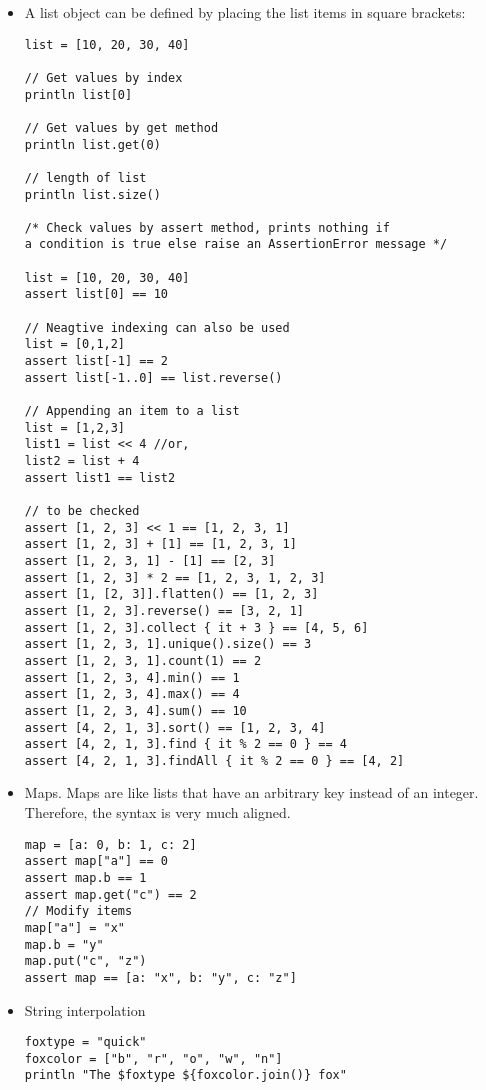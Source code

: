 \documentclass[letterpaper,11pt]{article}
\begin{document}
\begin{itemize}
    \item A list object can be defined by placing the list items in square brackets:
    \begin{verbatim}
list = [10, 20, 30, 40]

// Get values by index
println list[0]

// Get values by get method
println list.get(0)

// length of list
println list.size()

/* Check values by assert method, prints nothing if
a condition is true else raise an AssertionError message */

list = [10, 20, 30, 40]
assert list[0] == 10

// Neagtive indexing can also be used
list = [0,1,2]
assert list[-1] == 2
assert list[-1..0] == list.reverse()

// Appending an item to a list
list = [1,2,3]
list1 = list << 4 //or,
list2 = list + 4
assert list1 == list2

// to be checked
assert [1, 2, 3] << 1 == [1, 2, 3, 1]
assert [1, 2, 3] + [1] == [1, 2, 3, 1]
assert [1, 2, 3, 1] - [1] == [2, 3]
assert [1, 2, 3] * 2 == [1, 2, 3, 1, 2, 3]
assert [1, [2, 3]].flatten() == [1, 2, 3]
assert [1, 2, 3].reverse() == [3, 2, 1]
assert [1, 2, 3].collect { it + 3 } == [4, 5, 6]
assert [1, 2, 3, 1].unique().size() == 3
assert [1, 2, 3, 1].count(1) == 2
assert [1, 2, 3, 4].min() == 1
assert [1, 2, 3, 4].max() == 4
assert [1, 2, 3, 4].sum() == 10
assert [4, 2, 1, 3].sort() == [1, 2, 3, 4]
assert [4, 2, 1, 3].find { it % 2 == 0 } == 4
assert [4, 2, 1, 3].findAll { it % 2 == 0 } == [4, 2]
    \end{verbatim}
    \item Maps. Maps are like lists that have an arbitrary key instead of an integer. Therefore, the syntax is very much aligned.
    \begin{verbatim}
map = [a: 0, b: 1, c: 2]
assert map["a"] == 0
assert map.b == 1
assert map.get("c") == 2
// Modify items
map["a"] = "x"
map.b = "y"
map.put("c", "z")
assert map == [a: "x", b: "y", c: "z"]
    \end{verbatim}
    \item String interpolation
    \begin{verbatim}
foxtype = "quick"
foxcolor = ["b", "r", "o", "w", "n"]
println "The $foxtype ${foxcolor.join()} fox"


\end{verbatim}
\end{itemize}
\end{document}
